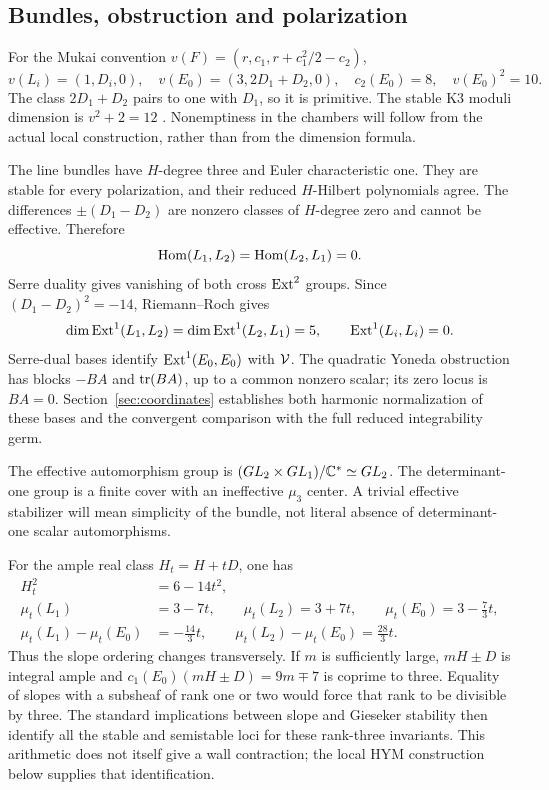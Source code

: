 \subsection{Bundles, obstruction and polarization}

For the Mukai convention $v(F)=(r,c_1,r+c_1^2/2-c_2)$,
\begin{equation}\label{eq:mukai-data}
v(L_i)=(1,D_i,0),\quad
v(E_0)=(3,2D_1+D_2,0),\quad c_2(E_0)=8,\quad v(E_0)^2=10.
\end{equation}
The class $2D_1+D_2$ pairs to one with $D_1$, so it is primitive.
The stable K3 moduli dimension is $v^2+2=12$
\cite{Muk84}. Nonemptiness in the chambers will follow from the
actual local construction, rather than from the dimension formula.

The line bundles have $H$-degree three and Euler characteristic one.
They are stable for every polarization, and their reduced $H$-Hilbert
polynomials agree. The differences $\pm(D_1-D_2)$ are nonzero classes
of $H$-degree zero and cannot be effective. Therefore
\[
\operatorname{Hom}(L_1,L_2)=\operatorname{Hom}(L_2,L_1)=0.
\]
Serre duality gives vanishing of both cross $\operatorname{Ext}^2$ groups.
Since $(D_1-D_2)^2=-14$, Riemann--Roch gives
\begin{equation}\label{eq:ext-dimensions}
\dim\operatorname{Ext}^1(L_1,L_2)=\dim\operatorname{Ext}^1(L_2,L_1)=5,\qquad
\operatorname{Ext}^1(L_i,L_i)=0.
\end{equation}
Serre-dual bases identify $\operatorname{Ext}^1(E_0,E_0)$ with $\mathcal V$.
The quadratic Yoneda obstruction has blocks $-BA$ and $\operatorname{tr}(BA)$,
up to a common nonzero scalar; its zero locus is $BA=0$.
Section~\ref{sec:coordinates} establishes both harmonic normalization
of these bases and the convergent comparison with the full reduced
integrability germ.

The effective automorphism group is
$(GL_2\times GL_1)/\mathbb C^*\simeq GL_2$.
The determinant-one group is a finite cover with an ineffective
$\mu_3$ center. A trivial effective stabilizer will mean simplicity of
the bundle, not literal absence of determinant-one scalar automorphisms.

For the ample real class $H_t=H+tD$, one has
\begin{align}
H_t^2&=6-14t^2,\nonumber\\
\mu_t(L_1)&=3-7t,\qquad \mu_t(L_2)=3+7t,\qquad
\mu_t(E_0)=3-\tfrac73t,\label{eq:slopes}\\
\mu_t(L_1)-\mu_t(E_0)&=-\tfrac{14}{3}t,\qquad
\mu_t(L_2)-\mu_t(E_0)=\tfrac{28}{3}t.\nonumber
\end{align}
Thus the slope ordering changes transversely. If $m$ is sufficiently
large, $mH\pm D$ is integral ample and
$c_1(E_0)(mH\pm D)=9m\mp7$ is coprime to three.
Equality of slopes with a subsheaf of rank one or two would force that
rank to be divisible by three. The standard implications between
slope and Gieseker stability then identify all the stable and
semistable loci for these rank-three invariants.
This arithmetic does not itself give a wall contraction; the local
HYM construction below supplies that identification.
